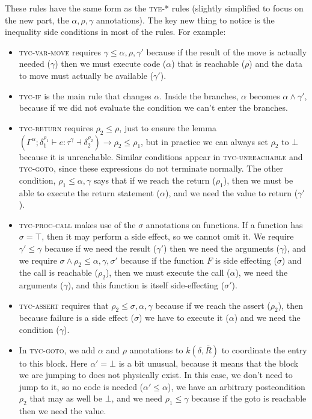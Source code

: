 \documentclass[acmsmall,nonacm]{acmart}
\newcommand{\proves}{\vdash}
\newcommand{\makes}{\dashv}
\begin{document}
These rules have the same form as the \textsc{tye-*} rules (slightly simplified to focus on the new part, the $\alpha,\rho,\gamma$ annotations). The key new thing to notice is the inequality side conditions in most of the rules. For example:
\begin{itemize}
\item \textsc{tyc-var-move} requires $\gamma\le \alpha,\rho,\gamma'$ because if the result of the move is actually needed ($\gamma$) then we must execute code ($\alpha$) that is reachable ($\rho$) and the data to move must actually be available ($\gamma'$).
\item \textsc{tyc-if} is the main rule that changes $\alpha$. Inside the branches, $\alpha$ becomes $\alpha\wedge \gamma'$, because if we did not evaluate the condition we can't enter the branches.
\item \textsc{tyc-return} requires $\rho_2\le \rho$, just to ensure the lemma $(\Gamma^\alpha;\delta_1^{\rho_1} \proves e:\tau^\gamma\makes\delta_2^{\rho_2})\to\rho_2\le\rho_1$, but in practice we can always set $\rho_2$ to $\bot$ because it is unreachable. Similar conditions appear in \textsc{tyc-unreachable} and \textsc{tyc-goto}, since these expressions do not terminate normally. The other condition, $\rho_1\le\alpha,\gamma$ says that if we reach the return ($\rho_1$), then we must be able to execute the return statement ($\alpha$), and we need the value to return ($\gamma'$).
\item \textsc{tyc-proc-call} makes use of the $\sigma$ annotations on functions. If a function has $\sigma=\top$, then it may perform a side effect, so we cannot omit it. We require $\gamma'\le \gamma$ because if we need the result ($\gamma'$) then we need the arguments ($\gamma$), and we require $\sigma\wedge\rho_2\le\alpha,\gamma,\sigma'$ because if the function $F$ is side effecting ($\sigma$) and the call is reachable ($\rho_2$), then we must execute the call ($\alpha$), we need the arguments ($\gamma$), and this function is itself side-effecting ($\sigma'$).
\item \textsc{tyc-assert} requires that $\rho_2\le\sigma,\alpha,\gamma$ because if we reach the assert ($\rho_2$), then because failure is a side effect ($\sigma$) we have to execute it ($\alpha$) and we need the condition ($\gamma$).
\item In \textsc{tyc-goto}, we add $\alpha$ and $\rho$ annotations to $k(\delta,\bar{R})$ to coordinate the entry to this block. Here $\alpha'=\bot$ is a bit unusual, because it means that the block we are jumping to does not physically exist. In this case, we don't need to jump to it, so no code is needed ($\alpha'\le \alpha$), we have an arbitrary postcondition $\rho_2$ that may as well be $\bot$, and we need $\rho_1\le\gamma$ because if the goto is reachable then we need the value.
\end{itemize}
\end{document}
